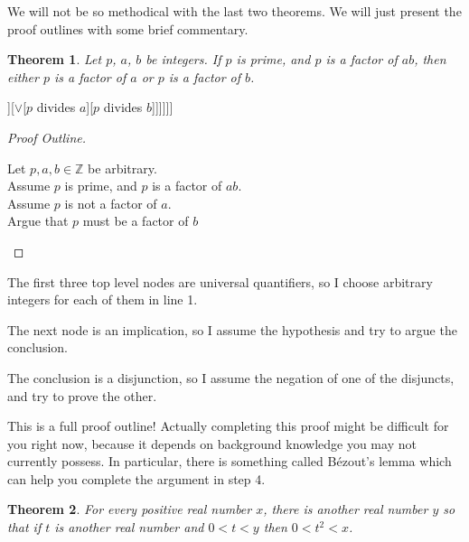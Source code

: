 \documentclass{article}
\newtheorem*{Theorem}{Theorem}
\newcommand{\Z}{\mathbb{Z}}
\begin{document}
 

We will not be so methodical with the last two theorems.  We will just present the proof outlines with some brief commentary.

\begin{Theorem}
		Let $p$, $a$, $b$ be integers.  If $p$ is prime, and $p$ is a factor of $ab$, then either $p$ is a factor of $a$ or $p$ is a factor of $b$.
	\end{Theorem}

\begin{center}
		\begin{forest}
				[$\forall p$[$\forall a$[$\forall b$[$\implies$[$\wedge$[$p$ is prime][$p$ divides $ab$]][$\vee$[$p$ divides $a$][$p$ divides $b$]]]]]]
			\end{forest}
	\end{center}

\begin{proof}[Proof Outline]
	
			\leavevmode\newline
		\begin{fitch}
				\textrm{Let $p, a, b \in \Z$ be arbitrary.}\\
				\textrm{Assume $p$ is prime, and $p$ is a factor of $ab$.}\\
				\fa \textrm{Assume $p$ is not a factor of $a$.}\\
				\fa \fa \textrm{Argue that $p$ must be a factor of $b$}
			\end{fitch}
		
	\end{proof}

The first three top level nodes are universal quantifiers, so I choose arbitrary integers for each of them in line 1.

The next node is an implication, so I assume the hypothesis and try to argue the conclusion.

The conclusion is a disjunction, so I assume the negation of one of the disjuncts, and try to prove the other.

This is a full proof outline!  Actually completing this proof might be difficult for you right now, because it depends on background knowledge you may not currently possess.  In particular, there is something called Bézout's lemma which can help you complete the argument in step 4.

 \medskip
 
\begin{Theorem}	
	For every positive real number $x$, there is another real number $y$ so that if $t$ is another real number and $0<t<y$ then $0<t^2<x$.
	\end{Theorem}
\end{document}
